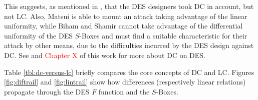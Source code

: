 \documentclass{report}
\begin{document}
This suggests, as mentioned in \cite{Susan}, that the DES designers took DC in account, but not LC. Also, Matsui \cite{Matsui1993LinearCM} is able to mount an attack taking advantage of the linear uniformity, while Biham and Shamir \cite{Shamir} cannot take advantage of the differential uniformity of the DES $S$-Boxes and must find a suitable characteristic for their attack by other means, due to the difficulties incurred by the DES design against DC. See \cite{Coppersmith1994} and \textcolor{red}{Chapter X} of this work for more about DC on DES. 

Table \ref{tbl:dc-versus-lc} briefly compares the core concepts of DC and LC. Figures \ref{fig:diftrail} and \ref{fig:lintrail} show how differences (respectively linear relations) propagate through the DES $F$ function and the $S$-Boxes.
\end{document}
